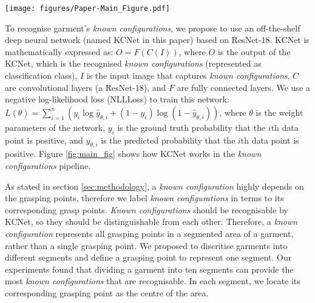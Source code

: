 \documentclass[conference]{IEEEtran}
\begin{document}

\begin{figure*}
    \centering
    \texttt{[image: figures/Paper-Main\_Figure.pdf]}
    \caption{\textit{\textit{Known Configurations} Pipeline}: a towel with a crumpled configuration (starting configuration) is grasped by a robot from a grasping point (the first grasping point as described in Section \ref{sec:methodology}), giving rise to a \textit{known configuration}. The \textit{known configuration} is recognised, and a pre-designed five-step manipulation plan (described in section \ref{sec:methodology}) can be chosen based on the recognised \textit{known configuration}. The robot manipulates the towel with the chosen manipulation plan.}
    \label{fig:main_fig}
\end{figure*}

To recognise garment's \textit{known configurations}, we propose to use an off-the-shelf deep neural network (named KCNet in this paper) based on ResNet-18\cite{he2016deep}. KCNet is mathematically expressed as: $O=F(C(I))$, where $O$ is the output of the KCNet, which is the recognised \textit{known configurations} (represented as classification class), $I$ is the input image that captures \textit{known configurations}, $C$ are convolutional layers (a ResNet-18\cite{he2016deep}), and $F$ are fully connected layers. We use a negative log-likelihood loss (NLLLoss) to train this network: $L(\theta)=\sum_{i=1}^{n}(y_{i}\log{\hat{y}_{\theta,i}}+(1-y_{i})\log(1-\hat{y}_{\theta,i}))$, where $\theta$ is the weight parameters of the network, $y_{i}$ is the ground truth probability that the $i$th data point is positive, and $\hat{y}_{\theta,i}$ is the predicted probability that the $i$th data point is positive. Figure \ref{fig:main_fig} shows how KCNet works in the \textit{known configurations} pipeline.

As stated in section \ref{sec:methodology}, a \textit{known configuration} highly depends on the grasping points, therefore we label \textit{known configurations} in terms to its corresponding grasp points. \textit{Known configurations} should be recognisable by KCNet, so they should be distinguishable from each other. Therefore, a \textit{known configuration} represents all grasping points in a segmented area of a garment, rather than a single grasping point. We proposed to discritise garments into different segments and define a grasping point to represent one segment. %
Our experiments found that dividing a garment into ten segments can provide the most \textit{known configurations} that are recognisable. In each segment, we locate its corresponding grasping point as the centre of the area.
\end{document}
